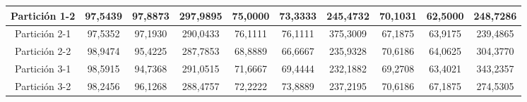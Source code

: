 \documentclass[12pt]{article}
\begin{document}
\begin{table}[H]
{\begin{tabular}{|c|ccc|ccc|ccc|}
Partición 1-2 & \multicolumn{1}{c|}{97,5439}                                                   & \multicolumn{1}{c|}{97,8873}                                                 & 297,9895 & \multicolumn{1}{c|}{75,0000}                                                  & \multicolumn{1}{c|}{73,3333}                                                 & 245,4732 & \multicolumn{1}{c|}{70,1031}                                                  & \multicolumn{1}{c|}{62,5000}                                                 & 248,7286 \\ \hline
Partición 2-1 & \multicolumn{1}{c|}{97,5352}                                                   & \multicolumn{1}{c|}{97,1930}                                                 & 290,0433 & \multicolumn{1}{c|}{76,1111}                                                  & \multicolumn{1}{c|}{76,1111}                                                 & 375,3009 & \multicolumn{1}{c|}{67,1875}                                                  & \multicolumn{1}{c|}{63,9175}                                                 & 239,4865 \\ \hline
Partición 2-2 & \multicolumn{1}{c|}{98,9474}                                                   & \multicolumn{1}{c|}{95,4225}                                                 & 287,7853 & \multicolumn{1}{c|}{68,8889}                                                  & \multicolumn{1}{c|}{66,6667}                                                 & 235,9328 & \multicolumn{1}{c|}{70,6186}                                                  & \multicolumn{1}{c|}{64,0625}                                                 & 304,3770 \\ \hline
Partición 3-1 & \multicolumn{1}{c|}{98,5915}                                                   & \multicolumn{1}{c|}{94,7368}                                                 & 291,0515 & \multicolumn{1}{c|}{71,6667}                                                  & \multicolumn{1}{c|}{69,4444}                                                 & 232,1882 & \multicolumn{1}{c|}{69,2708}                                                  & \multicolumn{1}{c|}{63,4021}                                                 & 343,2357 \\ \hline
Partición 3-2 & \multicolumn{1}{c|}{98,2456}                                                   & \multicolumn{1}{c|}{96,1268}                                                 & 288,4757 & \multicolumn{1}{c|}{72,2222}                                                  & \multicolumn{1}{c|}{73,8889}                                                 & 237,2195 & \multicolumn{1}{c|}{70,6186}                                                  & \multicolumn{1}{c|}{67,1875}                                                 & 274,5305 \\ \hline

\end{tabular}}
\end{table}
\end{document}
